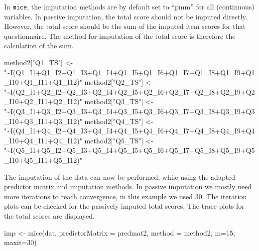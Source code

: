 \documentclass[
]{book}
\newenvironment{Shaded}{\begin{snugshade}}{\end{snugshade}}
\newcommand{\AttributeTok}[1]{\textcolor[rgb]{0.77,0.63,0.00}{#1}}
\newcommand{\DecValTok}[1]{\textcolor[rgb]{0.00,0.00,0.81}{#1}}
\newcommand{\FunctionTok}[1]{\textcolor[rgb]{0.00,0.00,0.00}{#1}}
\newcommand{\NormalTok}[1]{#1}
\newcommand{\OtherTok}[1]{\textcolor[rgb]{0.56,0.35,0.01}{#1}}
\newcommand{\StringTok}[1]{\textcolor[rgb]{0.31,0.60,0.02}{#1}}
\begin{document}
In \texttt{mice}, the imputation methods are by default set to ``pmm'' for all (continuous) variables. In passive imputation, the total score should not be imputed directly. However, the total score should be the sum of the imputed item scores for that questionnaire. The method for imputation of the total score is therefore the calculation of the sum.

\begin{Shaded}
\begin{Highlighting}[]
\NormalTok{method2[}\StringTok{"Q1\_TS"}\NormalTok{] }\OtherTok{\textless{}{-}} \StringTok{"\textasciitilde{}I(Q1\_I1+Q1\_I2+Q1\_I3+Q1\_I4+Q1\_I5+Q1\_I6+Q1\_I7+Q1\_I8+Q1\_I9+Q1\_I10+Q1\_I11+Q1\_I12)"}
\NormalTok{method2[}\StringTok{"Q2\_TS"}\NormalTok{] }\OtherTok{\textless{}{-}} \StringTok{"\textasciitilde{}I(Q2\_I1+Q2\_I2+Q2\_I3+Q2\_I4+Q2\_I5+Q2\_I6+Q2\_I7+Q2\_I8+Q2\_I9+Q2\_I10+Q2\_I11+Q2\_I12)"}
\NormalTok{method2[}\StringTok{"Q3\_TS"}\NormalTok{] }\OtherTok{\textless{}{-}} \StringTok{"\textasciitilde{}I(Q3\_I1+Q3\_I2+Q3\_I3+Q3\_I4+Q3\_I5+Q3\_I6+Q3\_I7+Q3\_I8+Q3\_I9+Q3\_I10+Q3\_I11+Q3\_I12)"}
\NormalTok{method2[}\StringTok{"Q4\_TS"}\NormalTok{] }\OtherTok{\textless{}{-}} \StringTok{"\textasciitilde{}I(Q4\_I1+Q4\_I2+Q4\_I3+Q4\_I4+Q4\_I5+Q4\_I6+Q4\_I7+Q4\_I8+Q4\_I9+Q4\_I10+Q4\_I11+Q4\_I12)"}
\NormalTok{method2[}\StringTok{"Q5\_TS"}\NormalTok{] }\OtherTok{\textless{}{-}} \StringTok{"\textasciitilde{}I(Q5\_I1+Q5\_I2+Q5\_I3+Q5\_I4+Q5\_I5+Q5\_I6+Q5\_I7+Q5\_I8+Q5\_I9+Q5\_I10+Q5\_I11+Q5\_I12)"}
\end{Highlighting}
\end{Shaded}

The imputation of the data can now be performed, while using the adapted predictor matrix and imputation methods. In passive imputation we mostly need more iterations to reach convergence, in this example we used 30. The iteration plots can be checked for the passively imputed total scores. The trace plots for the total scores are displayed.

\begin{Shaded}
\begin{Highlighting}[]
\NormalTok{imp }\OtherTok{\textless{}{-}} \FunctionTok{mice}\NormalTok{(dat, }\AttributeTok{predictorMatrix =}\NormalTok{ predmat2, }\AttributeTok{method =}\NormalTok{ method2, }\AttributeTok{m=}\DecValTok{15}\NormalTok{, }\AttributeTok{maxit=}\DecValTok{30}\NormalTok{)}
\end{Highlighting}
\end{Shaded}
\end{document}
